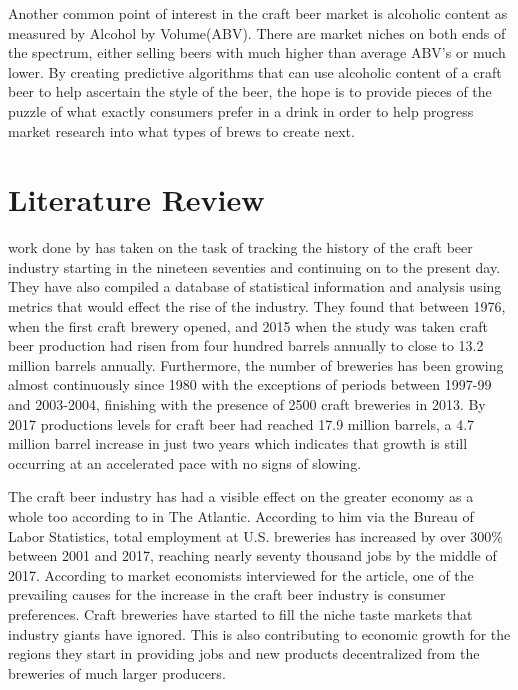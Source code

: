 \documentclass[12pt,english]{article}
\begin{document}
Another common point of interest in the craft beer market is alcoholic content as measured by Alcohol by Volume(ABV).  There are market niches on both ends of the spectrum, either selling beers with much higher than average ABV's or much lower.  By creating predictive algorithms that can use alcoholic content of a craft beer to help ascertain the style of the beer, the hope is to provide pieces of the puzzle of what exactly consumers prefer in a drink in order to help progress market research into what types of brews to create next.  

\section{Literature Review}\label{sec:litreview}
work done by \citet{elzinga_tremblay_tremblay_2015} has taken on the task of tracking the history of the craft beer industry starting in the nineteen seventies and continuing on to the present day.  They have also compiled a database of statistical information and analysis using metrics that would effect the rise of the industry.  They found that between 1976, when the first craft brewery opened, and 2015 when the study was taken craft beer production had risen from four hundred barrels annually to close to 13.2 million barrels annually.  Furthermore, the number of breweries has been growing almost continuously since 1980 with the exceptions of periods between 1997-99 and 2003-2004, finishing with the presence of 2500 craft breweries in 2013.  By 2017 productions levels for craft beer had reached 17.9 million barrels\citep{BrewersFriend}, a 4.7 million barrel increase in just two years which indicates that growth is still occurring at an accelerated pace with no signs of slowing.

The craft beer industry has had a visible effect on the greater economy as a whole too according to \citet{thompson_2018} in The Atlantic.  According to him via the Bureau of Labor Statistics, total employment at U.S. breweries has increased by over 300\% between 2001 and 2017, reaching nearly seventy thousand jobs by the middle of 2017.  According to market economists interviewed for the article, one of the prevailing causes for the increase in the craft beer industry is consumer preferences.  Craft breweries have started to fill the niche taste markets that industry giants have ignored.  This is also contributing to economic growth for the regions they start in providing jobs and new products decentralized from the breweries of much larger producers.  
\end{document}
